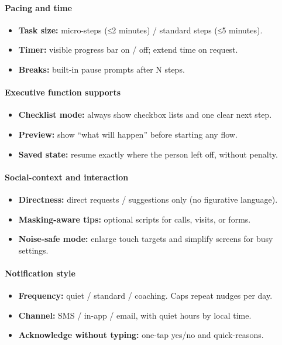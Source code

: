 \documentclass[12pt]{article}
\begin{document}
\paragraph{Pacing and time}
\begin{itemize}[leftmargin=*]
  \item \textbf{Task size:} micro-steps (≤2 minutes) / standard steps (≤5 minutes).
  \item \textbf{Timer:} visible progress bar on / off; extend time on request.
  \item \textbf{Breaks:} built-in pause prompts after N steps.
\end{itemize}

\paragraph{Executive function supports}
\begin{itemize}[leftmargin=*]
  \item \textbf{Checklist mode:} always show checkbox lists and one clear next step.
  \item \textbf{Preview:} show “what will happen” before starting any flow.
  \item \textbf{Saved state:} resume exactly where the person left off, without penalty.
\end{itemize}

\paragraph{Social-context and interaction}
\begin{itemize}[leftmargin=*]
  \item \textbf{Directness:} direct requests / suggestions only (no figurative language).
  \item \textbf{Masking-aware tips:} optional scripts for calls, visits, or forms.
  \item \textbf{Noise-safe mode:} enlarge touch targets and simplify screens for busy settings.
\end{itemize}

\paragraph{Notification style}
\begin{itemize}[leftmargin=*]
  \item \textbf{Frequency:} quiet / standard / coaching. Caps repeat nudges per day.
  \item \textbf{Channel:} SMS / in-app / email, with quiet hours by local time.
  \item \textbf{Acknowledge without typing:} one-tap yes/no and quick-reasons.
\end{itemize}
\end{document}
